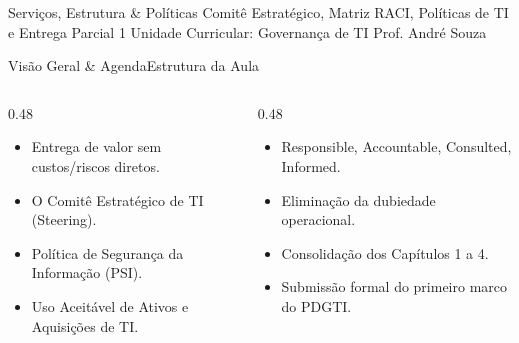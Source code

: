 
\senaicover
  {Serviços, Estrutura \& Políticas}
  {Comitê Estratégico, Matriz RACI, Políticas de TI e Entrega Parcial 1}
  {Unidade Curricular: Governança de TI}
  {Prof. André Souza}

\begin{senaiframe}{Visão Geral \& Agenda}{Estrutura da Aula}
  \begin{columns}[t]
    \begin{column}{0.48\textwidth}
      \begin{tcolorbox}[senaibluecard, title={1. Conceito de Serviço}]
        \begin{itemize}
          \item Entrega de valor sem custos/riscos diretos.
          \item O Comitê Estratégico de TI (Steering).
        \end{itemize}
      \end{tcolorbox}
      \vspace{4pt}
      \begin{tcolorbox}[senaiambercard, title={3. Políticas Fundamentais}]
        \begin{itemize}
          \item Política de Segurança da Informação (PSI).
          \item Uso Aceitável de Ativos e Aquisições de TI.
        \end{itemize}
      \end{tcolorbox}
    \end{column}
    \begin{column}{0.48\textwidth}
      \begin{tcolorbox}[senairedcard, title={2. A Matriz RACI}]
        \begin{itemize}
          \item Responsible, Accountable, Consulted, Informed.
          \item Eliminação da dubiedade operacional.
        \end{itemize}
      \end{tcolorbox}
      \vspace{4pt}
      \begin{tcolorbox}[senaigreencard, title={4. Entrega Parcial 1}]
        \begin{itemize}
          \item Consolidação dos Capítulos 1 a 4.
          \item Submissão formal do primeiro marco do PDGTI.
        \end{itemize}
      \end{tcolorbox}
    \end{column}
  \end{columns}
\end{senaiframe}


